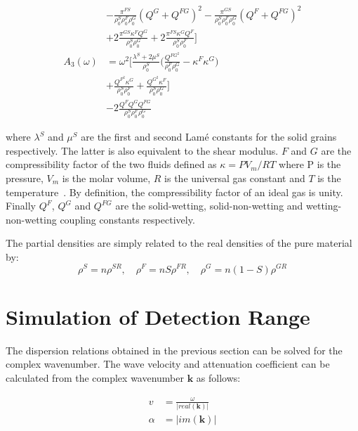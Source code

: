 \documentclass[twocolumn]{article}
\begin{document}
\begin{align*}
                & -\frac{\pi^{FS}}{\rho_0^S\rho_0^F\rho_0^G}(Q^G + Q^{FG})^2
    -\frac{\pi^{GS}}{\rho_0^S\rho_0^F\rho_0^G}(Q^F + Q^{FG})^2                                                 \\
                & + 2\frac{\pi^{GS}\kappa^FQ^G}{\rho_0^S\rho_0^G}
    + 2\frac{\pi^{FS}\kappa^GQ^F}{\rho_0^S\rho_0^F}\bigr]                                                      \\
    A_3(\omega) & = \omega^2\bigl[\frac{\lambda^S + 2\mu^S}{\rho_0^S}
    \bigl(\frac{Q^{FG^2}}{\rho_0^F\rho_0^G} - \kappa^F\kappa^G\bigr)                                           \\
                & +\frac{Q^{F^2}\kappa^G}{\rho_0^S\rho_0^F}+\frac{Q^{G^2}\kappa^F}{\rho_0^S\rho_0^G}\bigr]     \\
                & -2\frac{Q^FQ^GQ^{FG}}{\rho_0^S\rho_0^F\rho_0^G}
\end{align*}

where $\lambda^S$ and $\mu^S$ are the first and second Lamé constants for the solid grains respectively. The latter is also equivalent to the shear modulus. $F$ and $G$ are the compressibility factor of the two fluids defined as $\kappa = PV_m/RT$ where P is the pressure, $V_m$ is the molar volume, $R$ is the universal gas constant and $T$ is the temperature~\cite{mcquarrie_simon_1999}. By definition, the compressibility factor of an ideal gas is unity. Finally $Q^F$, $Q^G$ and $Q^{FG}$ are the solid-wetting, solid-non-wetting and wetting-non-wetting coupling constants respectively.

The partial densities are simply related to the real densities of the pure material by:
\begin{equation*}
    \rho^S = n\rho^{SR},\quad \rho^F = nS\rho^{FR},\quad \rho^G = n(1-S)\rho^{GR}
\end{equation*}

\section{Simulation of Detection Range}
The dispersion relations obtained in the previous section can be solved for the complex wavenumber. The wave velocity and attenuation coefficient can be calculated from the complex wavenumber $\textbf{k}$ as follows:

\begin{align*}
    v      & = \frac{\omega}{|real(\textbf{k})|} \\
    \alpha & = |im(\textbf{k})|
\end{align*}
\end{document}
